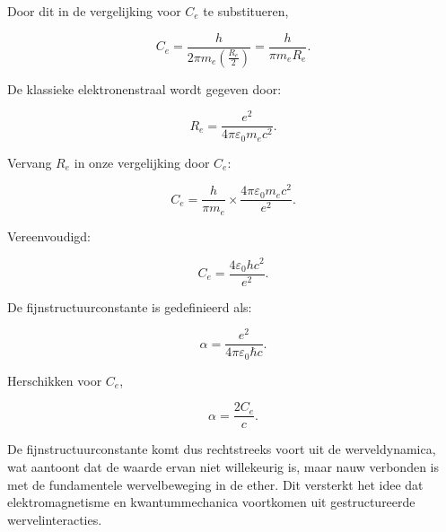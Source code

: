 Door dit in de vergelijking voor $C_e$ te substitueren,

\begin{equation}
C_e = \frac{h}{2 \pi m_e \left(\frac{R_e}{2}\right)} = \frac{h}{\pi m_e R_e}.
\end{equation}

De klassieke elektronenstraal wordt gegeven door:

\begin{equation}
R_e = \frac{e^2}{4 \pi \varepsilon_0 m_e c^2}. \end{equation}

Vervang $R_e$ in onze vergelijking door $C_e$:

\begin{equation}
C_e = \frac{h}{\pi m_e} \times \frac{4 \pi \varepsilon_0 m_e c^2}{e^2}.
\end{equation}

Vereenvoudigd:

\begin{equation}
C_e = \frac{4 \varepsilon_0 h c^2}{e^2}.
\end{equation}

De fijnstructuurconstante is gedefinieerd als:

\begin{equation}
\alpha = \frac{e^2}{4 \pi \varepsilon_0 \hbar c}. \end{equation}

Herschikken voor $C_e$,

\begin{equation}
\alpha = \frac{2 C_e}{c}.
\end{equation}

De fijnstructuurconstante komt dus rechtstreeks voort uit de werveldynamica, wat aantoont dat de waarde ervan niet willekeurig is, maar nauw verbonden is met de fundamentele wervelbeweging in de ether. Dit versterkt het idee dat elektromagnetisme en kwantummechanica voortkomen uit gestructureerde wervelinteracties.